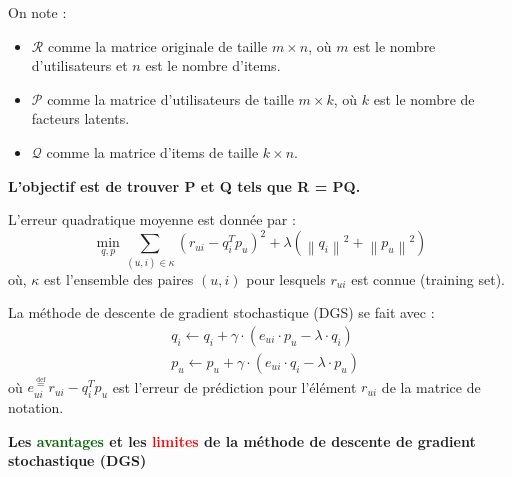 \begin{frame}{\PartieI}
    On note :
    \begin{itemize}
        \item $\mathcal{R}$ comme la matrice originale de taille $m \times n$, où $m$ est le nombre d'utilisateurs et $n$ est le nombre d'items.
        \item $\mathcal{P}$ comme la matrice d'utilisateurs de taille $m \times k$, où $k$ est le nombre de facteurs latents.
        \item $\mathcal{Q}$ comme la matrice d'items de taille $k \times n$.
    \end{itemize}
    \begin{center}
        \textbf{L'objectif est de trouver P et Q tels que R = PQ.}
    \end{center}
\end{frame}

\begin{frame}{\PartieI}
    L'erreur quadratique moyenne est donnée par :
    \begin{equation*}
        \min _{q, p} \sum_{(u, i) \in \kappa}\left(r_{u i}-q_i^T p_u\right)^2+\lambda\left(\left\|q_i\right\|^2+\left\|p_u\right\|^2\right)
    \end{equation*}
    où, $\kappa$ est l'ensemble des paires $(u,i)$ pour lesquels $r_{ui}$ est connue (training set).
\end{frame}

\begin{frame}{\PartieI}
    La méthode de descente de gradient stochastique (DGS) se fait avec :
    \begin{equation*}
        \begin{aligned}
             & q_i \leftarrow q_i+\gamma \cdot\left(e_{u i} \cdot p_u-\lambda \cdot q_i\right) \\
             & p_u \leftarrow p_u+\gamma \cdot\left(e_{u i} \cdot q_i-\lambda \cdot p_u\right)
        \end{aligned}
    \end{equation*}
    où $e_{u i}^{\stackrel{\text { def }}{=}} r_{u i}-q_i^T p_u$ est l'erreur de prédiction pour l'élément $r_{ui}$ de la matrice de notation.
\end{frame}

\begin{frame}{\PartieI}
    \begin{center}
        \textbf{\large{Les \textcolor{darkgreen}{avantages} et les \textcolor{red}{limites} de la méthode de descente de gradient stochastique (DGS)}}
    \end{center}
\end{frame}

